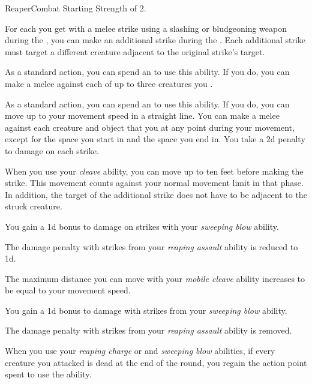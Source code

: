     \begin{feat}{Reaper}{Combat}
        \featpre Starting Strength of 2.

         For each  you get with a melee strike using a slashing or bludgeoning weapon during the , you can make an additional strike during the .
        Each additional strike must target a different creature adjacent to the original strike's target.

         As a standard action, you can spend an  to use this ability.
        If you do, you can make a melee  against each of up to three creatures you .

         As a standard action, you can spend an  to use this ability.
        If you do, you can move up to your movement speed in a straight line.
        You can make a melee  against each creature and object that you  at any point during your movement, except for the space you start in and the space you end in.
        You take a \minus2d penalty to damage on each strike.

         When you use your \textit{cleave} ability, you can move up to ten feet before making the strike.
        This movement counts against your normal movement limit in that phase.
        In addition, the target of the additional strike does not have to be adjacent to the struck creature.

         You gain a \plus1d bonus to damage on strikes with your \textit{sweeping blow} ability.

         The damage penalty with strikes from your \textit{reaping assault} ability is reduced to \minus1d.

         The maximum distance you can move with your \textit{mobile cleave} ability increases to be equal to your movement speed.

         You gain a \plus1d bonus to damage with strikes from your \textit{sweeping blow} ability.

         The damage penalty with strikes from your \textit{reaping assault} ability is removed.

         When you use your \textit{reaping charge} or and \textit{sweeping blow} abilities, if every creature you attacked is dead at the end of the round, you regain the action point spent to use the ability.
    \end{feat}


